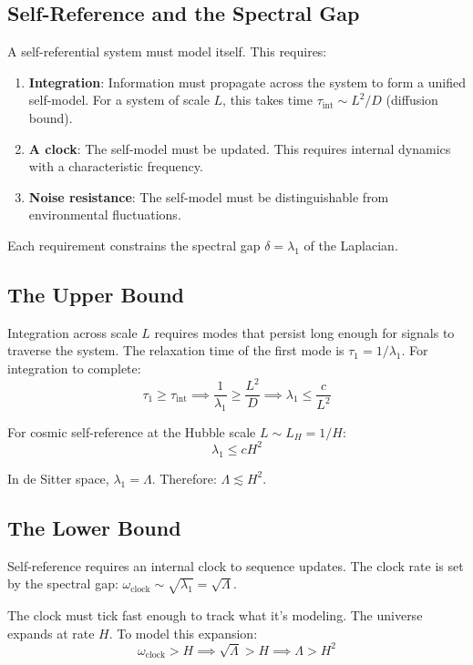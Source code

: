 \documentclass[11pt,a4paper]{article}
\theoremstyle{definition}
\theoremstyle{remark}
\begin{document}
\subsection{Self-Reference and the Spectral Gap}

A self-referential system must model itself. This requires:

\begin{enumerate}
    \item \textbf{Integration}: Information must propagate across the system to form a unified self-model. For a system of scale $L$, this takes time $\tau_{\text{int}} \sim L^2/D$ (diffusion bound).

    \item \textbf{A clock}: The self-model must be updated. This requires internal dynamics with a characteristic frequency.

    \item \textbf{Noise resistance}: The self-model must be distinguishable from environmental fluctuations.
\end{enumerate}

Each requirement constrains the spectral gap $\delta = \lambda_1$ of the Laplacian.

\subsection{The Upper Bound}

Integration across scale $L$ requires modes that persist long enough for signals to traverse the system. The relaxation time of the first mode is $\tau_1 = 1/\lambda_1$. For integration to complete:
\[
\tau_1 \geq \tau_{\text{int}} \implies \frac{1}{\lambda_1} \geq \frac{L^2}{D} \implies \lambda_1 \leq \frac{c}{L^2}
\]

For cosmic self-reference at the Hubble scale $L \sim L_H = 1/H$:
\[
\lambda_1 \leq cH^2
\]

In de Sitter space, $\lambda_1 = \Lambda$. Therefore: $\Lambda \lesssim H^2$.

\subsection{The Lower Bound}

Self-reference requires an internal clock to sequence updates. The clock rate is set by the spectral gap: $\omega_{\text{clock}} \sim \sqrt{\lambda_1} = \sqrt{\Lambda}$.

The clock must tick fast enough to track what it's modeling. The universe expands at rate $H$. To model this expansion:
\[
\omega_{\text{clock}} > H \implies \sqrt{\Lambda} > H \implies \Lambda > H^2
\]
\end{document}
